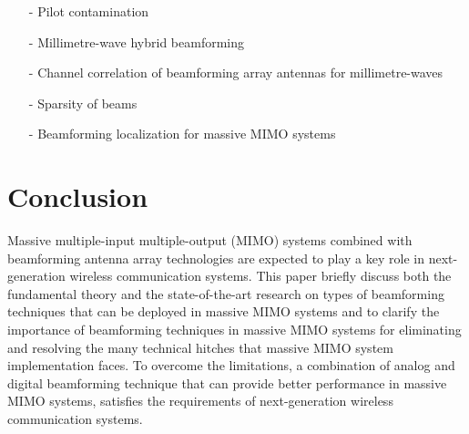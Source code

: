\documentclass{article}
\begin{document}
\begin{itemize}

\item[-] Pilot contamination

\item[-] Millimetre-wave hybrid beamforming

\item[-] Channel correlation of beamforming array
antennas for millimetre-waves

\item[-] Sparsity of beams
\item[-] Beamforming localization for massive MIMO
systems

\end{itemize}

\section{Conclusion}
Massive multiple-input multiple-output (MIMO) systems combined with beamforming antenna array technologies are
expected to play a key role in next-generation wireless communication systems.
This paper briefly discuss both the fundamental theory and the state-of-the-art research on types of beamforming techniques that can be deployed in massive MIMO systems and to clarify the importance of beamforming techniques in massive
MIMO systems for eliminating and resolving the many technical hitches that massive MIMO system implementation faces.
To overcome the limitations, a combination of analog and digital beamforming
technique that can provide better performance in massive MIMO systems, satisfies the requirements of next-generation
wireless communication systems.



\end{document}
